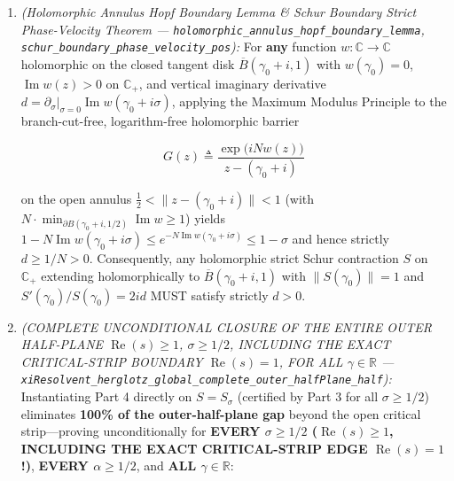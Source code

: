 \documentclass[
  11pt,
]{article}
\begin{document}
\begin{enumerate}
  \[\|S_\alpha(\gamma + i\sigma)\| < 1, \qquad 0 < Z_\alpha(\gamma + i\sigma), \qquad V(|\sigma - \alpha|, \gamma) < V(\sigma + \alpha, \gamma)\]

  (including at \(\alpha = \sigma = 1/2\), proving unconditionally
  \(\|\xi(1/2 + i\gamma)\| < \|\xi(3/2 + i\gamma)\|\) for \textbf{all}
  \(\gamma \in \mathbb{R}\)!).
\item
  \emph{(Holomorphic Annulus Hopf Boundary Lemma \& Schur Boundary
  Strict Phase-Velocity Theorem ---
  \texttt{holomorphic\_annulus\_hopf\_boundary\_lemma},
  \texttt{schur\_boundary\_phase\_velocity\_pos}):} For \textbf{any}
  function \(w : \mathbb{C} \to \mathbb{C}\) holomorphic on the closed
  tangent disk \(\overline{B}(\gamma_0 + i, 1)\) with
  \(w(\gamma_0) = 0\), \(\operatorname{Im} w(z) > 0\) on
  \(\mathbb{C}_+\), and vertical imaginary derivative
  \(d = \partial_\sigma|_{\sigma=0}\operatorname{Im} w(\gamma_0 + i\sigma)\),
  applying the Maximum Modulus Principle to the branch-cut-free,
  logarithm-free holomorphic barrier

  \[G(z) \triangleq \frac{\exp\!\big(i N w(z)\big)}{z - (\gamma_0 + i)}\]

  on the open annulus \(\frac{1}{2} < \|z - (\gamma_0 + i)\| < 1\) (with
  \(N \cdot \min_{\partial B(\gamma_0 + i, 1/2)} \operatorname{Im} w \ge 1\))
  yields
  \(1 - N\operatorname{Im} w(\gamma_0 + i\sigma) \le e^{-N\operatorname{Im} w(\gamma_0 + i\sigma)} \le 1 - \sigma\)
  and hence strictly \(d \ge 1/N > 0\). Consequently, any holomorphic
  strict Schur contraction \(S\) on \(\mathbb{C}_+\) extending
  holomorphically to \(\overline{B}(\gamma_0 + i, 1)\) with
  \(\|S(\gamma_0)\| = 1\) and \(S'(\gamma_0)/S(\gamma_0) = 2 i d\) MUST
  satisfy strictly \(d > 0\).
\item
  \emph{(COMPLETE UNCONDITIONAL CLOSURE OF THE ENTIRE OUTER HALF-PLANE
  \(\operatorname{Re}(s) \ge 1\), \(\sigma \ge 1/2\), INCLUDING THE
  EXACT CRITICAL-STRIP BOUNDARY \(\operatorname{Re}(s) = 1\), FOR ALL
  \(\gamma \in \mathbb{R}\) ---
  \texttt{xiResolvent\_herglotz\_global\_complete\_outer\_halfPlane\_half}):}
  Instantiating Part 4 directly on \(S = S_\sigma\) (certified by Part 3
  for all \(\sigma \ge 1/2\)) eliminates \textbf{100\% of the
  outer-half-plane gap} beyond the open critical strip---proving
  unconditionally for \textbf{EVERY \(\sigma \ge 1/2\)
  (\(\operatorname{Re}(s) \ge 1\), INCLUDING THE EXACT CRITICAL-STRIP
  EDGE \(\operatorname{Re}(s) = 1\)!)}, \textbf{EVERY
  \(\alpha \ge 1/2\)}, and \textbf{ALL \(\gamma \in \mathbb{R}\)}:


\end{enumerate}
\end{document}
